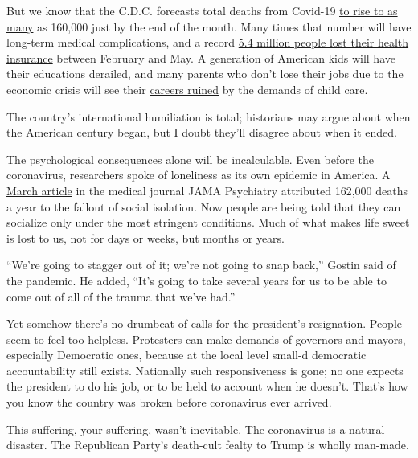 But we know that the C.D.C. forecasts total deaths from Covid-19
\href{https://www.cdc.gov/coronavirus/2019-ncov/covid-data/forecasting-us.html}{to
rise to as many} as 160,000 just by the end of the month. Many times
that number will have long-term medical complications, and a record
\href{https://www.nytimes.com/2020/07/13/world/coronavirus-updates.html\#link-4a45abca}{5.4
million people lost their health insurance} between February and May. A
generation of American kids will have their educations derailed, and
many parents who don't lose their jobs due to the economic crisis will
see their
\href{https://www.theatlantic.com/family/archive/2020/07/working-parents-careers-school-childcare/613936/}{careers
ruined} by the demands of child care.

The country's international humiliation is total; historians may argue
about when the American century began, but I doubt they'll disagree
about when it ended.

The psychological consequences alone will be incalculable. Even before
the coronavirus, researchers spoke of loneliness as its own epidemic in
America. A
\href{https://jamanetwork.com/journals/jamapsychiatry/fullarticle/2762469?guestAccessKey=b70282f9-d0c1-43f8-ba38-18a2b6831cc7\&utm_source=For_The_Media\&utm_medium=referral\&utm_campaign=ftm_links\&utm_content=tfl\&utm_term=030420}{March
article} in the medical journal JAMA Psychiatry attributed 162,000
deaths a year to the fallout of social isolation. Now people are being
told that they can socialize only under the most stringent conditions.
Much of what makes life sweet is lost to us, not for days or weeks, but
months or years.

``We're going to stagger out of it; we're not going to snap back,''
Gostin said of the pandemic. He added, ``It's going to take several
years for us to be able to come out of all of the trauma that we've
had.''

Yet somehow there's no drumbeat of calls for the president's
resignation. People seem to feel too helpless. Protesters can make
demands of governors and mayors, especially Democratic ones, because at
the local level small-d democratic accountability still exists.
Nationally such responsiveness is gone; no one expects the president to
do his job, or to be held to account when he doesn't. That's how you
know the country was broken before coronavirus ever arrived.

This suffering, your suffering, wasn't inevitable. The coronavirus is a
natural disaster. The Republican Party's death-cult fealty to Trump is
wholly man-made.

